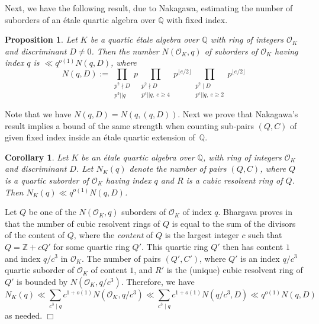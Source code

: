 \documentclass{article}
\def\Z{{\mathbb Z}}
\def\O{{\mathcal O}}
\def\Q{{\mathbb Q}}
\def\Z{{\mathbb Z}}
\def\Q{{\mathbb Q}}
\newtheorem{corollary}[theorem]{Corollary}
\newtheorem{proposition}[theorem]{Proposition}
\newenvironment{proof}{\noindent {\bf Proof:}}{$\Box$ \vspace{2 ex}}
\begin{document}
Next, we have the following result, due to Nakagawa, estimating the number of suborders of an \'etale quartic algebra over $\Q$ with fixed index.

\begin{proposition}\label{prop:Nak}
Let $K$ be a quartic \'etale algebra over $\Q$ with ring of integers $\O_K$ and discriminant $D\neq 0$. Then the number $N(\O_K,q)$ of suborders of $\O_K$ having index $q$ is $\ll q^{o(1)} N(q,D)$, where
\begin{equation}\label{eq:NakBound}
N(q,D):=\prod_{\substack{p^2\nmid D\\p^3||q}}p
\prod_{\substack{p^2\nmid D\\p^e||q,\ e\geq 4}}p^{\lfloor e/2\rfloor}
\prod_{\substack{p^2\mid D\\p^e||q,\ e\geq 2}}p^{\lfloor e/2\rfloor}
\end{equation}
\end{proposition}
Note that we have $N(q,D)=N(q,(q,D))$.
Next we prove that Nakagawa's result implies a bound of the same strength when counting sub-pairs $(Q,C)$ of given fixed index inside an \'etale quartic extension of~$\Q$.

\begin{corollary}\label{cor:Nak}
Let $K$ be an \'etale quartic algebra over $\Q$, with ring of integers $\O_K$ and discriminant $D$. Let $N_K(q)$ denote the number of pairs $(Q,C)$, where $Q$ is a quartic suborder of $\O_K$ having index $q$ and $R$ is a cubic resolvent ring of $Q$. Then $N_K(q)\ll q^{o(1)} N(q,D)$.
\end{corollary}
\begin{proof}
Let $Q$ be one of the $N(\O_K,q)$ suborders of $\O_K$ of index $q$. Bhargava proves in \cite[Corollary 4]{BHCL3} that the number of cubic resolvent rings of $Q$ is equal to the sum of the divisors of the content of $Q$, where the {\it content} of $Q$ is the largest integer $c$ such that $Q=\Z+cQ'$ for some quartic ring $Q'$. This quartic ring $Q'$ then has content $1$ and index $q/c^3$ in $\O_K$. The number of pairs $(Q',C')$, where $Q'$ is an index $q/c^3$ quartic suborder of $\O_K$ of content $1$, and $R'$ is the (unique) cubic resolvent ring of $Q'$ is bounded by $N(\O_K,q/c^3)$. Therefore, we have
\begin{equation*}
N_K(q)\ll \sum_{c^3\mid q} c^{1+o(1)} N(\O_K,q/c^3)\ll
\sum_{c^3\mid q} c^{1+o(1)} N(q/c^3,D)\ll q^{o(1)} N(q,D)
\end{equation*}
as needed.
\end{proof}
\end{document}
